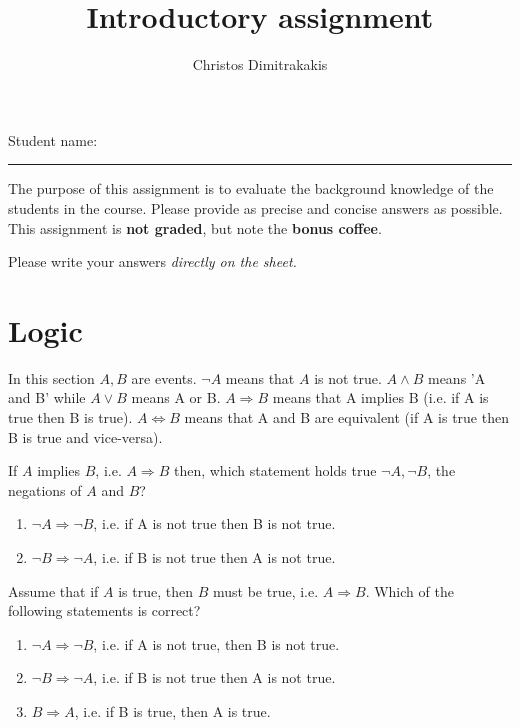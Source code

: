 \documentclass[a4paper]{article}
\title{Introductory assignment}
\author{Christos Dimitrakakis}
\begin{document}
\maketitle

{\Large Student name:}
\vspace{0.5em}
\hrule
\vspace{1em}
The purpose of this assignment is to evaluate the background knowledge
of the students in the course. Please provide as precise and concise
answers as possible. This assignment is \textbf{not graded}, but note the \textbf{bonus coffee}.

Please write your answers \emph{directly on the sheet.}

\section{Logic}
In this section $A, B$ are events. $\neg A$ means that $A$ is not true. $A \wedge B$ means 'A and B' while $A
\vee B$ means A or B. $A \Rightarrow B$ means that A implies B (i.e. if A is true then B is true).
$A \Leftrightarrow B$ means that A and B are equivalent (if A is true then B is true and vice-versa).

\begin{exercise}
  If $A$ implies $B$, i.e. $A \Rightarrow B$ then, which statement holds true $\neg A, \neg B$, the negations of $A$ and $B$?
  \begin{enumerate}
  \item $\neg A \Rightarrow \neg B$, i.e. if A is not true then B is not true.
  \item $\neg B \Rightarrow \neg A$, i.e. if B is not true then A is not true.
  \end{enumerate}
\end{exercise}

\begin{exercise}
  Assume that if $A$ is true, then $B$ must be true, i.e.
  $A \Rightarrow B$. Which of the following statements is correct?
  \begin{enumerate}
  \item $\neg A \Rightarrow \neg B$, i.e. if A is not true, then B is not true.
  \item $\neg B \Rightarrow \neg A$, i.e. if B is not true then A is not true.
  \item $B \Rightarrow A$, i.e. if B is true, then A is true.
  \end{enumerate}
\end{exercise}
\end{document}
